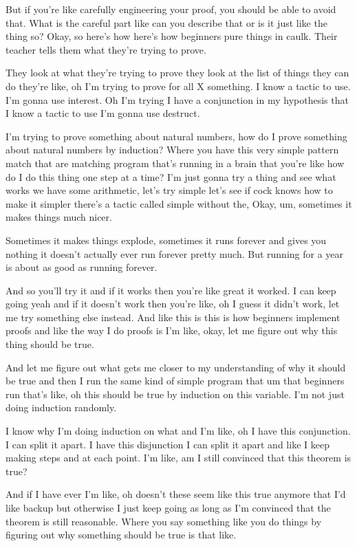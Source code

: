 But if you're like carefully engineering your proof, you should be able to avoid that. What is the careful part like can you describe that or is it just like the thing so? Okay, so here's how here's how beginners pure things in caulk. Their teacher tells them what they're trying to prove. 

They look at what they're trying to prove they look at the list of things they can do they're like, oh I'm trying to prove for all X something. I know a tactic to use. I'm gonna use interest. Oh I'm trying I have a conjunction in my hypothesis that I know a tactic to use I'm gonna use destruct. 

I'm trying to prove something about natural numbers, how do I prove something about natural numbers by induction? Where you have this very simple pattern match that are matching program that's running in a brain that you're like how do I do this thing one step at a time? I'm just gonna try a thing and see what works we have some arithmetic, let's try simple let's see if cock knows how to make it simpler there's a tactic called simple without the, Okay, um, sometimes it makes things much nicer. 

Sometimes it makes things explode, sometimes it runs forever and gives you nothing it doesn't actually ever run forever pretty much. But running for a year is about as good as running forever. 

And so you'll try it and if it works then you're like great it worked. I can keep going yeah and if it doesn't work then you're like, oh I guess it didn't work, let me try something else instead. And like this is this is how beginners implement proofs and like the way I do proofs is I'm like, okay, let me figure out why this thing should be true. 

And let me figure out what gets me closer to my understanding of why it should be true and then I run the same kind of simple program that um that beginners run that's like, oh this should be true by induction on this variable. I'm not just doing induction randomly. 

I know why I'm doing induction on what and I'm like, oh I have this conjunction. I can split it apart. I have this disjunction I can split it apart and like I keep making steps and at each point. I'm like, am I still convinced that this theorem is true? 

And if I have ever I'm like, oh doesn't these seem like this true anymore that I'd like backup but otherwise I just keep going as long as I'm convinced that the theorem is still reasonable. Where you say something like you do things by figuring out why something should be true is that like. 

